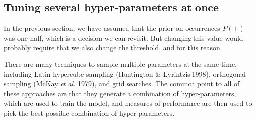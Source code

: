 \documentclass[
  letterpaper,
]{scrbook}
\begin{document}
{
\makeatletter
\def\LT@makecaption#1#2#3{%
  \noalign{\smash{\hbox{\kern\textwidth\rlap{\kern\marginparsep
  \parbox[t]{\marginparwidth}{%
    \footnotesize{%
      \vspace{(1.1\baselineskip)}
    #1{#2: }\ignorespaces #3}}}}}}%
    }
\makeatother

\begin{figure}[bt]



\end{figure}%

}

\subsection{Tuning several hyper-parameters at
once}\label{tuning-several-hyper-parameters-at-once}

In the previous section, we have assumed that the prior on occurrences
\(P(+)\) was one half, which is a decision we can revisit. But changing
this value would probably require that we also change the threshold, and
for this reason

There are many techniques to sample multiple parameters at the same
time, including Latin hypercube sampling (Huntington \& Lyrintzis 1998),
orthogonal sampling (McKay \emph{et al.} 1979), and grid searches. The
common point to all of these approaches are that they generate a
combination of hyper-parameters, which are used to train the model, and
measures of performance are then used to pick the best possible
combination of hyper-parameters.

{
\makeatletter
\def\LT@makecaption#1#2#3{%
  \noalign{\smash{\hbox{\kern\textwidth\rlap{\kern\marginparsep
  \parbox[t]{\marginparwidth}{%
    \footnotesize{%
      \vspace{(1.1\baselineskip)}
    #1{#2: }\ignorespaces #3}}}}}}%
    }
\makeatother

\begin{figure}[bt]



\end{figure}%

}
\end{document}
